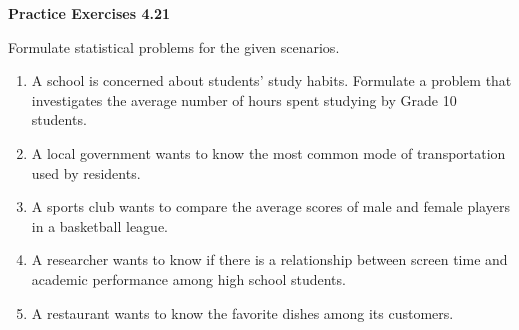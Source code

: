 \vspace{0.3ex}
\noindent\textbf{Practice Exercises 4.21}

\vspace{0.2ex}

Formulate statistical problems for the given scenarios. 

\begin{enumerate}
    \item A school is concerned about students’ study habits. Formulate a problem that investigates the average number of hours spent studying by Grade 10 students.
    \item A local government wants to know the most common mode of transportation used by residents. 
    \item A sports club wants to compare the average scores of male and female players in a basketball league. 
    \item A researcher wants to know if there is a relationship between screen time and academic performance among high school students. 
    \item A restaurant wants to know the favorite dishes among its customers. 
\end{enumerate}
